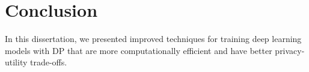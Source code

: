 \chapter{Conclusion}\label{ch_6}

In this dissertation, we presented improved techniques for training deep learning models with DP that are more computationally efficient and have better privacy-utility trade-offs.
